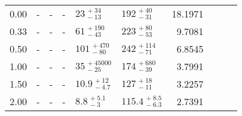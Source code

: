 \begin{tabular}{@{}rllr llr llr @{}}
\cmidrule(lr){1-7}
0.00 & - & - & -
     & ${23}^{\,+34}_{\,-13}$ & ${192}^{\,+40}_{\,-31}$ & 18.1971 \\[1.5pt]
0.33 & - & - & -
     & ${61}^{\,+190}_{\,-43}$ & ${223}^{\,+80}_{\,-53}$ & 9.7081 \\[1.5pt]
0.50 & - & - & -
     & ${101}^{\,+470}_{\,-80}$ & ${242}^{\,+114}_{\,-71}$ & 6.8545 \\[1.5pt]
1.00 & - & - & -
     & ${35}^{\,+45000}_{\,-25}$ & ${174}^{\,+680}_{\,-39}$ & 3.7991 \\[1.5pt]
1.50 & - & - & -
     & ${10.9}^{\,+12}_{\,-4.7}$ & ${127}^{\,+18}_{\,-11}$ & 3.2257 \\[1.5pt]
2.00 & - & - & -
     & ${8.8}^{\,+5.1}_{\,-3}$ & ${115.4}^{\,+8.5}_{\,-6.3}$ & 2.7391 \\

\bottomrule
\end{tabular}
